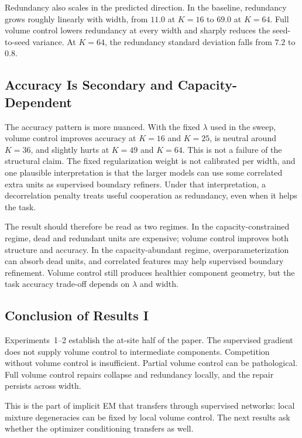 Redundancy also scales in the predicted direction. In the baseline, redundancy
grows roughly linearly with width, from $11.0$ at $K=16$ to $69.0$ at $K=64$.
Full volume control lowers redundancy at every width and sharply reduces the
seed-to-seed variance. At $K=64$, the redundancy standard deviation falls from
$7.2$ to $0.8$.

\subsection{Accuracy Is Secondary and Capacity-Dependent}
The accuracy pattern is more nuanced. With the fixed $\lambda$ used in the
sweep, volume control improves accuracy at $K=16$ and $K=25$, is neutral
around $K=36$, and slightly hurts at $K=49$ and $K=64$. This is not a failure
of the structural claim. The fixed regularization weight is not calibrated per
width, and one plausible interpretation is that the larger models can use some
correlated extra units as supervised boundary refiners. Under that
interpretation, a decorrelation penalty treats useful cooperation as
redundancy, even when it helps the task.

The result should therefore be read as two regimes. In the
capacity-constrained regime, dead and redundant units are expensive; volume
control improves both structure and accuracy. In the capacity-abundant regime,
overparameterization can absorb dead units, and correlated features may help
supervised boundary refinement. Volume control still produces healthier
component geometry, but the task accuracy trade-off depends on $\lambda$ and
width.

\subsection{Conclusion of Results I}
Experiments~1--2 establish the at-site half of the paper. The supervised
gradient does not supply volume control to intermediate components.
Competition without volume control is insufficient. Partial volume control can
be pathological. Full volume control repairs collapse and redundancy locally,
and the repair persists across width.

This is the part of implicit EM that transfers through supervised networks:
local mixture degeneracies can be fixed by local volume control. The next
results ask whether the optimizer conditioning transfers as well.